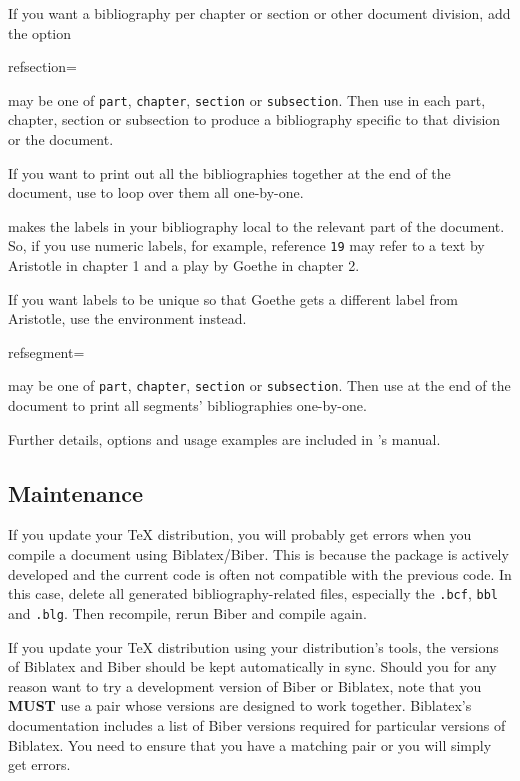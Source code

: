If you want a bibliography per chapter or section or other document division, add the option
\begin{semiverbatim}
  refsection=
\end{semiverbatim}
 may be one of \texttt{part}, \texttt{chapter}, \texttt{section} or \texttt{subsection}.
Then use  in each part, chapter, section or subsection to produce a bibliography specific to that division or the document.

If you want to print out all the bibliographies together at the end of the document, use  to loop over them all one-by-one.

 makes the labels in your bibliography local to the relevant part of the document.
So, if you use numeric labels, for example, reference \texttt{19} may refer to a text by Aristotle in chapter 1 and a play by Goethe in chapter 2.

If you want labels to be unique so that Goethe gets a different label from Aristotle, use the  environment instead.
\begin{semiverbatim}
  refsegment=
\end{semiverbatim}
 may be one of \texttt{part}, \texttt{chapter}, \texttt{section} or \texttt{subsection}.
Then use  at the end of the document to print all segments' bibliographies one-by-one.

Further details, options and usage examples are included in 's manual.


\subsection{Maintenance}\label{subsec:maintain}


If you update your \TeX{} distribution, you will probably get errors when you compile a document using Biblatex/Biber.
This is because the package is actively developed and the current code is often not compatible with the previous code.
In this case, delete all generated bibliography-related files, especially the \texttt{.bcf}, \texttt{bbl} and \texttt{.blg}.
Then recompile, rerun Biber and compile again.

If you update your \TeX{} distribution using your distribution's tools, the versions of Biblatex and Biber should be kept automatically in sync.
Should you for any reason want to try a development version of Biber or Biblatex, note that you \textbf{MUST} use a pair whose versions are designed to work together.
Biblatex's documentation includes a list of Biber versions required for particular versions of Biblatex.
You need to ensure that you have a matching pair or you will simply get errors.




